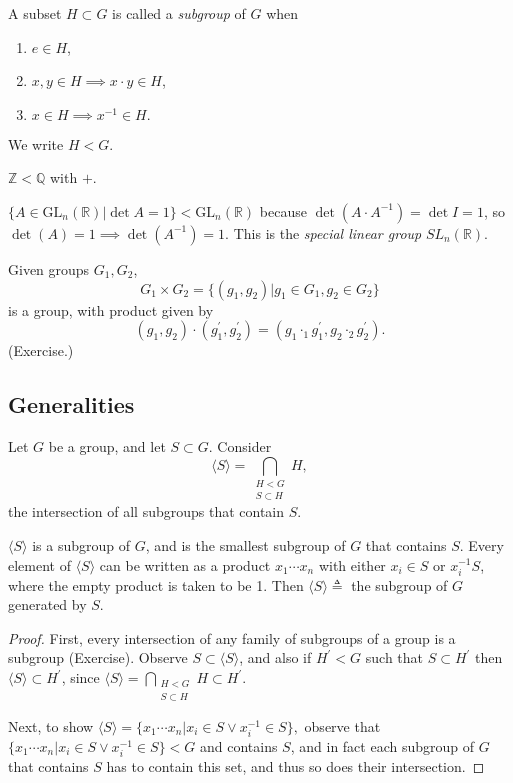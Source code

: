 \documentclass{article}
\begin{document}
\begin{defn}[Subgroup]
  \label{def:subgroup}
  A subset $H \subset G$ is called a \emph{subgroup} of $G$ when
  \begin{enumerate}
    \item{$e \in H$,}
    \item{$x, y \in H \implies x \cdot y \in H$,}
    \item{$x \in H \implies x^{-1} \in H.$}
  \end{enumerate}
  We write $H < G$.
\end{defn}

\begin{xmpl}
  \item{$\mathbb{Z} < \mathbb{Q}$ with $+$.}
  \item{$\{A \in \mathrm{GL}_n(\mathbb{R}) | \det A = 1\} < \mathrm{GL}_n(\mathbb{R})$
        because $\det (A \cdot A^{-1}) = \det I = 1$, 
        so $\det(A) = 1 \implies \det(A^{-1}) = 1$. This is the
        \emph{special linear group} $SL_n(\mathbb{R})$.
       }
\end{xmpl}

\begin{defn}
  Given groups $G_1, G_2$, 
  $$
  G_1 \times G_2 = \{(g_1, g_2) | g_1 \in G_1, g_2 \in G_2 \}
  $$
  is a group, with product given by
  $$
  (g_1, g_2) \cdot (g_1^\prime, g_2^\prime) 
  = (g_1 \cdot_1 g_1^\prime, g_2 \cdot_2 g_2^\prime).
  $$
  (Exercise.)
\end{defn}

\subsection{Generalities}
Let $G$ be a group, and let $S \subset G$. Consider
$$
\langle S \rangle = \bigcap_{\substack{H < G \\ S \subset H}} H,
$$
the intersection of all subgroups that contain $S$.

\begin{prop}
$\langle S \rangle$ is a subgroup of $G$, and is the smallest
subgroup of $G$ that contains $S$. Every element of $\langle S \rangle$
can be written as a product $x_1 \cdots x_n$ with either $x_i \in S$ or
$x_i^{-1} S$, where the empty product is taken to be 1. Then
$\langle S \rangle \triangleq$ the subgroup of $G$ generated by $S$.
\end{prop}

\begin{proof}
First, every intersection of any family of subgroups of a group is a
subgroup (Exercise). Observe $S \subset \langle S \rangle$, and also if
$H^\prime < G$ such that $S \subset H^\prime$ then 
$\langle S \rangle \subset H^\prime$, since 
$\langle S \rangle = \bigcap_{\substack{H < G \\ S \subset H}} H \subset H^\prime$.

Next, to show
$\langle S \rangle = \{ x_1 \cdots x_n | x_i \in S \lor x_i^{-1} \in S \},$
observe that $\{ x_1 \cdots x_n | x_i \in S \lor x_i^{-1} \in S \} < G$ and
contains $S$, and in fact each subgroup of $G$ that contains $S$ has to
contain this set, and thus so does their intersection.
\end{proof}
\end{document}
